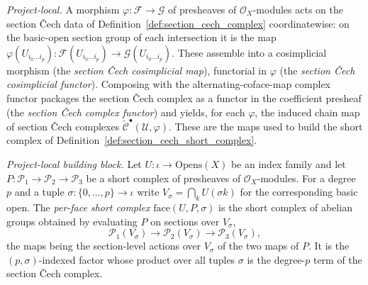 \begin{definition}
  \label{def:section_cech_functoriality}
  \textit{Project-local.}
  A morphism \(\varphi : \mathcal{F} \to \mathcal{G}\) of presheaves of \(\mathcal{O}_X\)-modules
  acts on the section {\v C}ech data of Definition~\ref{def:section_cech_complex} coordinatewise:
  on the basic-open section group of each intersection it is the map
  \(\varphi(U_{i_0 \ldots i_p}) : \mathcal{F}(U_{i_0 \ldots i_p}) \to \mathcal{G}(U_{i_0 \ldots
  i_p})\). These assemble into a cosimplicial morphism (the \emph{section {\v C}ech cosimplicial
  map}), functorial in \(\varphi\) (the \emph{section {\v C}ech cosimplicial functor}). Composing
  with the alternating-coface-map complex functor packages the section {\v C}ech complex as a
  functor in the coefficient presheaf (the \emph{section {\v C}ech complex functor}) and yields,
  for each \(\varphi\), the induced chain map of section {\v C}ech complexes
  \(\check{\mathcal{C}}^\bullet(\mathcal{U}, \varphi)\). These are the maps used to build the short
  complex of Definition~\ref{def:section_cech_short_complex}.
\end{definition}

\begin{definition}

  \label{def:face_short_complex}
  \textit{Project-local building block.}
  Let \(U : \iota \to \mathrm{Opens}(X)\) be an index family and let
  \(P : \mathcal{P}_1 \to \mathcal{P}_2 \to \mathcal{P}_3\) be a short complex of presheaves of
  \(\mathcal{O}_X\)-modules. For a degree \(p\) and a tuple \(\sigma : \{0, \ldots, p\} \to \iota\)
  write \(V_\sigma = \bigcap_k U(\sigma k)\) for the corresponding basic open. The \emph{per-face
  short complex} \(\mathrm{face}(U, P, \sigma)\) is the short complex of abelian groups obtained by
  evaluating \(P\) on sections over \(V_\sigma\),
  \[
    \mathcal{P}_1(V_\sigma) \longrightarrow \mathcal{P}_2(V_\sigma) \longrightarrow
      \mathcal{P}_3(V_\sigma),
  \]
  the maps being the section-level actions over \(V_\sigma\) of the two maps of \(P\). It is the
  \((p, \sigma)\)-indexed factor whose product over all tuples \(\sigma\) is the degree-\(p\) term
  of the section {\v C}ech complex.
\end{definition}

